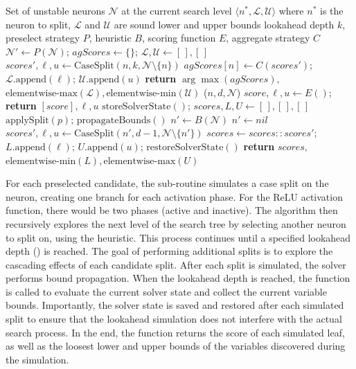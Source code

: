 \documentclass{article}
\begin{document}
\begin{algorithm}[!t]
\caption{Lookahead Branching}
\label{alg:lookahead}
\begin{algorithmic}[1]
 Set of unstable neurons $\mathcal{N}$ at the current search level
 $\langle n^*, \mathcal{L}, \mathcal{U} \rangle$ where $n^*$ is the neuron to split, $\mathcal{L}$ and $\mathcal{U}$ are sound lower and upper bounds
 lookahead depth $k$, preselect strategy $P$, heuristic $B$, scoring function $E$, aggregate strategy $C$
\STATE $\mathcal{N}' \gets P(\mathcal{N})$; $agScores \gets \{\}$; $\mathcal{L}, \mathcal{U} \gets [\,], [\,]$
    \STATE $scores', \ell, u \gets \text{CaseSplit}(n, k, \mathcal{N} \setminus \{n\})$
    \STATE $agScores[n] \gets C(scores')$; $\mathcal{L}.\text{append}(\ell)$; $\mathcal{U}.\text{append}(u)$
\ENDFOR
\STATE \textbf{return} $\arg \max (agScores),$
\STATE \hspace{2.15em} $\text{elementwise-max}(\mathcal{L}), \text{elementwise-min}(\mathcal{U})$
 ($n, d, \mathcal{N}$)
    \STATE $score, \ell, u \gets E()$; \textbf{return} $[score], \ell, u$
\ELSE
    \STATE $\text{storeSolverState}()$; $scores, L, U \gets [\,], [\,], [\,]$
        \STATE $\text{applySplit}(p)$; $\text{propagateBounds}()$
         \STATE $n' \gets B(\mathcal{N})$ \ELSE \STATE $n' \gets nil$ \ENDIF
        \STATE $scores', \ell, u \gets \text{CaseSplit}(n', d - 1, \mathcal{N} \setminus \{n'\})$
        \STATE $scores \gets scores \mathbin{::} scores'$; $L.\text{append}(\ell)$; $U.\text{append}(u)$; $\text{restoreSolverState}()$
    \ENDFOR
    \STATE \textbf{return} $scores,$
    \STATE \hspace{2.15em} $\text{elementwise-min}(L), \text{elementwise-max}(U)$
\ENDIF
\end{algorithmic}
\end{algorithm}

For each preselected candidate, the \casesplit sub-routine simulates a case split on the neuron, creating one branch for each activation phase. For the ReLU activation function, there would be two phases (active and inactive). The algorithm then recursively explores the next level of the search tree by selecting another neuron to split on, using the \baseSelect heuristic. This process continues until a specified lookahead depth (\paramDepth) is reached. The goal of performing additional splits is to explore the cascading effects of each candidate split. After each split is simulated, the solver performs bound propagation. When the lookahead depth is reached, the \eval function is called to evaluate the current solver state and collect the current variable bounds. Importantly, the solver state is saved and restored after each simulated split to ensure that the lookahead simulation does not interfere with the actual search process. In the end, the \casesplit function returns the score of each simulated leaf, as well as the loosest lower and upper bounds of the variables discovered during the simulation.
\end{document}
